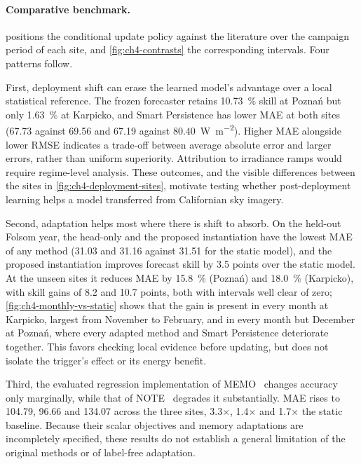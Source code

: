 \paragraph{Comparative benchmark.}  positions the conditional update policy against the literature over the campaign period of each site, and \cref{fig:ch4-contrasts} the corresponding intervals. Four patterns follow.

First, deployment shift can erase the learned model's advantage over a local statistical reference. The frozen forecaster retains \SI{+10.73}{\percent} skill at Poznań but only \SI{+1.63}{\percent} at Karpicko, and Smart Persistence has lower MAE at both sites (\num{67.73} against \num{69.56} and \num{67.19} against \SI{80.40}{\watt\per\square\meter}). Higher MAE alongside lower RMSE indicates a trade-off between average absolute error and larger errors, rather than uniform superiority. Attribution to irradiance ramps would require regime-level analysis. These outcomes, and the visible differences between the sites in \cref{fig:ch4-deployment-sites}, motivate testing whether post-deployment learning helps a model transferred from Californian sky imagery.

Second, adaptation helps most where there is shift to absorb. On the held-out Folsom year, the head-only and the proposed instantiation have the lowest MAE of any method (\num{31.03} and \num{31.16} against \num{31.51} for the static model), and the proposed instantiation improves forecast skill by \num{3.5} points over the static model. At the unseen sites it reduces MAE by \SI{15.8}{\percent} (Poznań) and \SI{18.0}{\percent} (Karpicko), with skill gains of \num{8.2} and \num{10.7} points, both with intervals well clear of zero; \cref{fig:ch4-monthly-vs-static} shows that the gain is present in every month at Karpicko, largest from November to February, and in every month but December at Poznań, where every adapted method and Smart Persistence deteriorate together. This favors checking local evidence before updating, but does not isolate the trigger's effect or its energy benefit.

Third, the evaluated regression implementation of MEMO~\citep{NEURIPS2022memo} changes accuracy only marginally, while that of NOTE~\citep{gong2022note} degrades it substantially. MAE rises to \num{104.79}, \num{96.66} and \num{134.07} across the three sites, \num{3.3}$\times$, \num{1.4}$\times$ and \num{1.7}$\times$ the static baseline. Because their scalar objectives and memory adaptations are incompletely specified, these results do not establish a general limitation of the original methods or of label-free adaptation.

